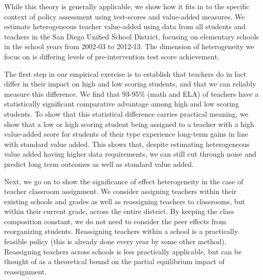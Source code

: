 \documentclass[12pt]{article}
\theoremstyle{definition}
\theoremstyle{definition}
\theoremstyle{definition}
\theoremstyle{definition}
\begin{document}
    
    While this theory is generally applicable, we show how it fits in to the specific context of policy assessment using test-scores and value-added measures. We estimate heterogeneous teacher value-added  using data from all students and teachers in the San Diego Unified School District, focusing on elementary schools in the school years from 2002-03 to 2012-13. The dimension of heterogeneity we focus on is differing levels of pre-intervention test score achievement. 
    

    The first step in our empirical exercise is to establish that teachers do in fact differ in their impact on high and low scoring students, and that we can reliably measure this difference. We find that 93-95\% (math and ELA) of teachers have a statistically significant comparative advantage among high and low scoring students. To show that this statistical difference carries practical meaning, we show that a low or high scoring student being assigned to a teacher with a high value-added score for students of their type experience long-term gains in line with standard value added. This shows that, despite estimating heterogeneous value added having higher data requirements, we can still cut through noise and predict long term outcomes as well as standard value added.

    Next, we go on to show the significance of effect heterogeneity in the case of teacher classroom assignment. We consider assigning teachers within their existing schools and grades as well as reassigning teachers to classrooms, but within their current grade, across the entire district. By keeping the class composition constant, we do not need to consider the peer effects from reorganizing students. Reassigning teachers within a school is a practically feasible policy (this is already done every year by some other method). Reassigning teachers across schools  is less practically applicable, but can be thought of as a theoretical bound on the partial equilibrium impact of reassignment. 
\end{document}
